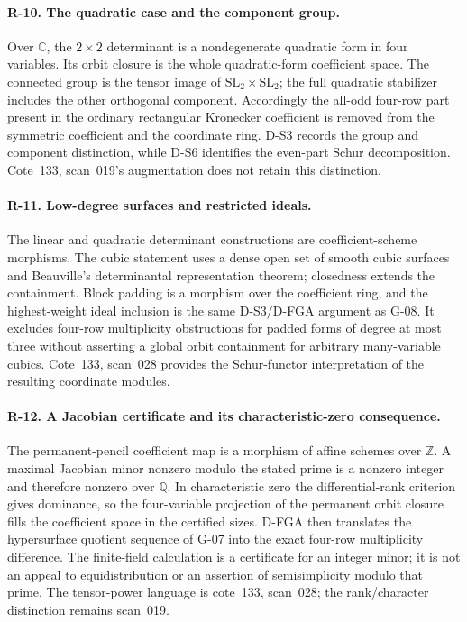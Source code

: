 \documentclass[11pt,a4paper]{article}
\theoremstyle{definition}\newtheorem{definition}{Definition}
\begin{document}
\paragraph{R-10. The quadratic case and the component group.}
Over $\mathbb C$, the $2\times2$ determinant is a nondegenerate quadratic form in four variables. Its orbit closure is the whole quadratic-form coefficient space. The connected group is the tensor image of $\mathrm{SL}_2\times\mathrm{SL}_2$; the full quadratic stabilizer includes the other orthogonal component. Accordingly the all-odd four-row part present in the ordinary rectangular Kronecker coefficient is removed from the symmetric coefficient and the coordinate ring. D-S3 records the group and component distinction, while D-S6 identifies the even-part Schur decomposition. Cote~133, scan~019's augmentation does not retain this distinction.

\paragraph{R-11. Low-degree surfaces and restricted ideals.}
The linear and quadratic determinant constructions are coefficient-scheme morphisms. The cubic statement uses a dense open set of smooth cubic surfaces and Beauville's determinantal representation theorem; closedness extends the containment. Block padding is a morphism over the coefficient ring, and the highest-weight ideal inclusion is the same D-S3/D-FGA argument as G-08. It excludes four-row multiplicity obstructions for padded forms of degree at most three without asserting a global orbit containment for arbitrary many-variable cubics. Cote~133, scan~028 provides the Schur-functor interpretation of the resulting coordinate modules.

\paragraph{R-12. A Jacobian certificate and its characteristic-zero consequence.}
The permanent-pencil coefficient map is a morphism of affine schemes over $\mathbb Z$. A maximal Jacobian minor nonzero modulo the stated prime is a nonzero integer and therefore nonzero over $\mathbb Q$. In characteristic zero the differential-rank criterion gives dominance, so the four-variable projection of the permanent orbit closure fills the coefficient space in the certified sizes. D-FGA then translates the hypersurface quotient sequence of G-07 into the exact four-row multiplicity difference. The finite-field calculation is a certificate for an integer minor; it is not an appeal to equidistribution or an assertion of semisimplicity modulo that prime. The tensor-power language is cote~133, scan~028; the rank/character distinction remains scan~019.
\end{document}
